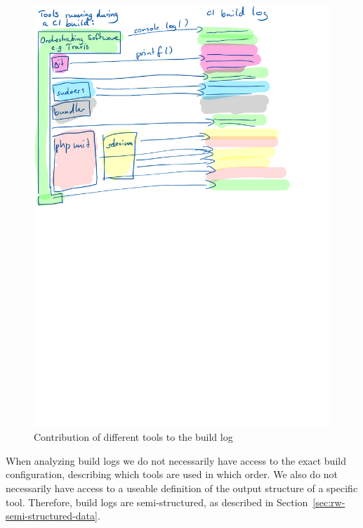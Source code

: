 \documentclass[\myrootdir/main.tex]{subfiles}
\begin{document}
\begin{figure}[htbp]
	\centering
	\includegraphics[width=\textwidth, trim={0cm 15cm 0cm 0cm}, clip]{img/tool-log-contribution.pdf}
	\caption{Contribution of different tools to the build log}
	\label{fig:tool-log-contribution}
\end{figure}

When analyzing build logs we do not necessarily have access to the exact build configuration, describing which tools are used in which order.
We also do not necessarily have access to a useable definition of the output structure of a specific tool.
Therefore, build logs are semi-structured, as described in Section~\ref{sec:rw-semi-structured-data}.
\end{document}
